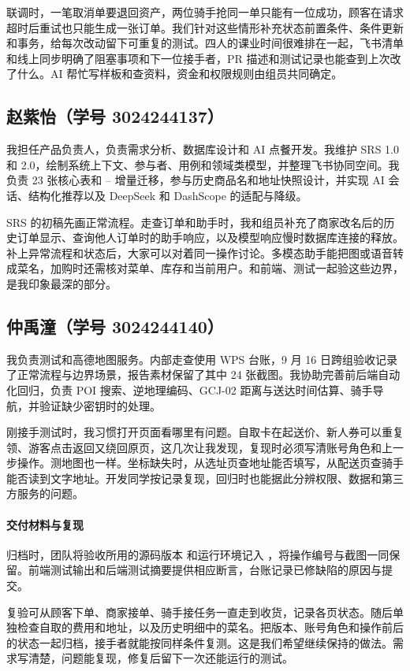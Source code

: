 联调时，一笔取消单要退回资产，两位骑手抢同一单只能有一位成功，顾客在请求超时后重试也只能生成一张订单。我们针对这些情形补充状态前置条件、条件更新和事务，给每次改动留下可重复的测试。四人的课业时间很难排在一起，飞书清单和线上同步明确了阻塞事项和下一位接手者，PR 描述和测试记录也能查到上次改了什么。AI 帮忙写样板和查资料，资金和权限规则由组员共同确定。

\subsection{赵紫怡（学号 3024244137）}

我担任产品负责人，负责需求分析、数据库设计和 AI 点餐开发。我维护 SRS 1.0 和 2.0，绘制系统上下文、参与者、用例和领域类模型，并整理飞书协同空间。我负责 23 张核心表和 -- 增量迁移，参与历史商品名和地址快照设计，并实现 AI 会话、结构化推荐以及 DeepSeek 和 DashScope 的适配与降级。

SRS 的初稿先画正常流程。走查订单和助手时，我和组员补充了商家改名后的历史订单显示、查询他人订单时的助手响应，以及模型响应慢时数据库连接的释放。补上异常流程和状态后，大家可以对着同一操作讨论。多模态助手能把图或语音转成菜名，加购时还需核对菜单、库存和当前用户。和前端、测试一起验这些边界，是我印象最深的部分。

\subsection{仲禹潼（学号 3024244140）}

我负责测试和高德地图服务。内部走查使用 WPS 台账，9 月 16 日跨组验收记录了正常流程与边界场景，报告素材保留了其中 24 张截图。我协助完善前后端自动化回归，负责 POI 搜索、逆地理编码、GCJ-02 距离与送达时间估算、骑手导航，并验证缺少密钥时的处理。

刚接手测试时，我习惯打开页面看哪里有问题。自取卡在起送价、新人券可以重复领、游客点击返回又绕回原页，这几次让我发现，复现时必须写清账号角色和上一步操作。测地图也一样。坐标缺失时，从选址页查地址能否填写，从配送页查骑手能否读到文字地址。开发同学按记录复现，回归时也能据此分辨权限、数据和第三方服务的问题。

\paragraph{交付材料与复现}
归档时，团队将验收所用的源码版本  和运行环境记入 ，将操作编号与截图一同保留。前端测试输出和后端测试摘要提供相应断言，台账记录已修缺陷的原因与提交。

复验可从顾客下单、商家接单、骑手接任务一直走到收货，记录各页状态。随后单独检查自取的费用和地址，以及历史明细中的菜名。把版本、账号角色和操作前后的状态一起归档，接手者就能按同样条件复测。这是我们希望继续保持的做法。需求写清楚，问题能复现，修复后留下一次还能运行的测试。
